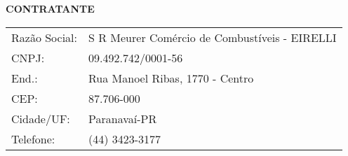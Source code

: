 %




\textbf{CONTRATANTE} \\


\begin{tabular}{p{4cm} p{11cm}}
	Razão Social: & S R Meurer Comércio de Combustíveis - EIRELLI\\ 
	CNPJ: & 09.492.742/0001-56\\ %
	End.: & Rua Manoel Ribas,  1770	- Centro\\
	CEP: & 87.706-000\\	
	Cidade/UF: & Paranavaí-PR\\
	Telefone: & (44) 3423-3177\\
\end{tabular}
\vfill

